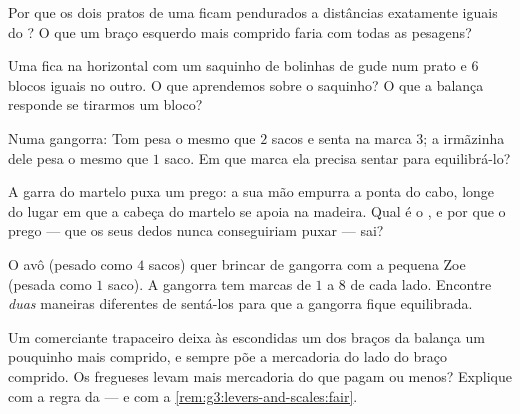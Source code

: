 \begin{exercise}[$\star$]\label{exo:g3:levers-and-scales:6}
Por que os dois pratos de uma  ficam pendurados a
distâncias exatamente iguais do ? O que um braço
esquerdo mais comprido faria com todas as pesagens?
\end{exercise}

\begin{exercise}[$\star$]\label{exo:g3:levers-and-scales:7}
Uma  fica na horizontal com um saquinho de bolinhas
de gude num prato e $6$ blocos iguais no outro. O que aprendemos
sobre o saquinho? O que a balança responde se tirarmos um bloco?
\end{exercise}

\begin{exercise}[$\star$]\label{exo:g3:levers-and-scales:8}
Numa gangorra: Tom pesa o mesmo que $2$ sacos e senta na marca $3$; a
irmãzinha dele pesa o mesmo que $1$ saco. Em que marca ela precisa
sentar para equilibrá-lo?
\end{exercise}

\begin{exercise}[$\star$]\label{exo:g3:levers-and-scales:9}
A garra do martelo puxa um prego: a sua mão empurra a ponta do cabo,
longe do lugar em que a cabeça do martelo se apoia na madeira. Qual é
o , e por que o prego --- que os seus dedos nunca
conseguiriam puxar --- sai?
\end{exercise}

\begin{exercise}[$\star\star$]\label{exo:g3:levers-and-scales:10}
O avô (pesado como $4$ sacos) quer brincar de gangorra com a pequena
Zoe (pesada como $1$ saco). A gangorra tem marcas de $1$ a $8$ de
cada lado. Encontre \emph{duas} maneiras diferentes de sentá-los para
que a gangorra fique equilibrada.
\end{exercise}

\begin{exercise}[$\star\star$]\label{exo:g3:levers-and-scales:11}
Um comerciante trapaceiro deixa às escondidas um dos braços da
balança um pouquinho mais comprido, e sempre põe a mercadoria do lado
do braço comprido. Os fregueses levam mais mercadoria do que pagam ou
menos? Explique com a regra da  --- e com a
\cref{rem:g3:levers-and-scales:fair}.
\end{exercise}

